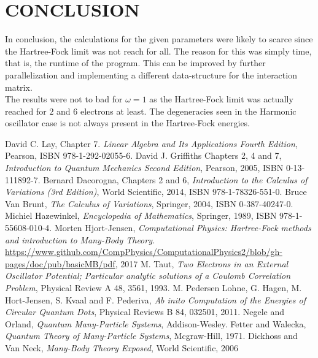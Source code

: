 \documentclass[a4paper, hidelinks, 10pt]{article}
\let\oldsection\section
\renewcommand{\section}[1]{\centering \oldsection{{#1}} \justifying}
\begin{document}
\section{CONCLUSION}
\label{sec:conclusion}
    In conclusion, the calculations for the given parameters were likely to
    scarce since the Hartree-Fock limit was not reach for all. The reason for
    this was simply time, that is, the runtime of the program. This can be
    improved by further parallelization and implementing a different
    data-structure for the interaction matrix. \\

    \noindent
    The results were not to bad for $\omega=1$ as the Hartree-Fock limit was
    actually reached for $2$ and $6$ electrons at least. The degeneracies seen
    in the Harmonic oscillator case is not always present in the Hartree-Fock
    energies.

\begin{thebibliography}{}
        David C. Lay, Chapter 7.
        \textit{Linear Algebra and Its Applications Fourth Edition},
        Pearson, ISBN 978-1-292-02055-6.
        David J. Griffiths Chapters 2, 4 and 7,
        \textit{Introduction to Quantum Mechanics Second Edition},
        Pearson, 2005, ISBN 0-13-111892-7.
        Bernard Dacorogna, Chapters 2 and 6,
        \textit{Introduction to the Calculus of Variations (3rd Edition)},
        World Scientific, 2014, ISBN 978-1-78326-551-0.
        Bruce Van Brunt,
        \textit{The Calculus of Variations},
        Springer, 2004, ISBN 0-387-40247-0.
        Michiel Hazewinkel,
        \textit{Encyclopedia of Mathematics},
        Springer, 1989, ISBN 978-1-55608-010-4.
        Morten Hjort-Jensen,
        \textit{Computational Physics: Hartree-Fock methods and introduction to Many-Body Theory.} \\
        \url{https://www.github.com/CompPhysics/ComputationalPhysics2/blob/gh-pages/doc/pub/basicMB/pdf}, 2017
        M. Taut, 
        \textit{Two Electrons in an External Oscillator Potential; Particular analytic solutions of a Coulomb Correlation Problem},
        Physical Review A 48, 3561, 1993.
        M. Pedersen Lohne, G. Hagen, M. Hort-Jensen, S. Kvaal and F. Pederiva,
        \textit{Ab inito Computation of the Energies of Circular Quantum Dots},
        Physical Reviews B 84, 032501, 2011.
        Negele and Orland,
        \textit{Quantum Many-Particle Systems},
        Addison-Wesley.
        Fetter and Walecka,
        \textit{Quantum Theory of Many-Particle Systems},
        Mcgraw-Hill, 1971.
        Dickhoss and Van Neck,
        \textit{Many-Body Theory Exposed},
        World Scientific, 2006
\end{thebibliography}
\end{document}
